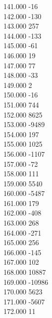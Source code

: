 { 141.000	-16 \\
 142.000	-130 \\
 143.000	257 \\
 144.000	-133 \\
 145.000	-61 \\
 146.000	19 \\
 147.000	77 \\
 148.000	-33 \\
 149.000	2 \\
 150.000	-16 \\
 151.000	744 \\
 152.000	8625 \\
 153.000	-9489 \\
 154.000	197 \\
 155.000	1025 \\
 156.000	-1107 \\
 157.000	-72 \\
 158.000	111 \\
 159.000	5540 \\
 160.000	-5487 \\
 161.000	179 \\
 162.000	-408 \\
 163.000	268 \\
 164.000	-271 \\
 165.000	256 \\
 166.000	-145 \\
 167.000	102 \\
 168.000	10887 \\
 169.000	-10986 \\
 170.000	5623 \\
 171.000	-5607 \\
 172.000	11 \\
}
